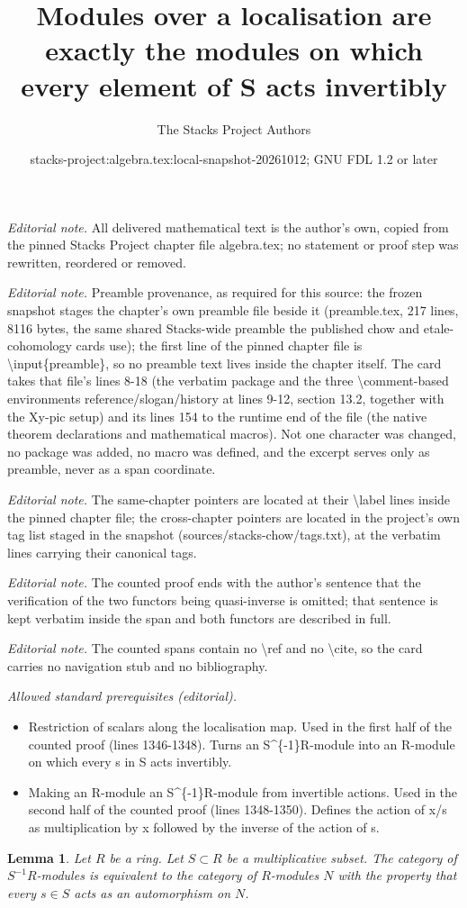 \documentclass[10pt,a4paper]{amsart}
\title{Modules over a localisation are exactly the modules on which every element of S acts invertibly}
\author{The Stacks Project Authors}
\date{stacks-project:algebra.tex:local-snapshot-20261012; GNU FDL 1.2 or later}
\theoremstyle{plain}
\newtheorem{lemma}[subsection]{Lemma}
\theoremstyle{definition}
\theoremstyle{remark}
\numberwithin{equation}{subsection}
\begin{document}
\maketitle
\noindent\textit{Editorial note.} All delivered mathematical text is the author's own, copied from the pinned Stacks Project chapter file algebra.tex; no statement or proof step was rewritten, reordered or removed.\par\medskip
\noindent\textit{Editorial note.} Preamble provenance, as required for this source: the frozen snapshot stages the chapter's own preamble file beside it (preamble.tex, 217 lines, 8116 bytes, the same shared Stacks-wide preamble the published chow and etale-cohomology cards use); the first line of the pinned chapter file is \textbackslash{}input\{preamble\}, so no preamble text lives inside the chapter itself. The card takes that file's lines 8-18 (the verbatim package and the three \textbackslash{}comment-based environments reference/slogan/history at lines 9-12, section 13.2, together with the Xy-pic setup) and its lines 154 to the runtime end of the file (the native theorem declarations and mathematical macros). Not one character was changed, no package was added, no macro was defined, and the excerpt serves only as preamble, never as a span coordinate.\par\medskip
\noindent\textit{Editorial note.} The same-chapter pointers are located at their \textbackslash{}label lines inside the pinned chapter file; the cross-chapter pointers are located in the project's own tag list staged in the snapshot (sources/stacks-chow/tags.txt), at the verbatim lines carrying their canonical tags.\par\medskip
\noindent\textit{Editorial note.} The counted proof ends with the author's sentence that the verification of the two functors being quasi-inverse is omitted; that sentence is kept verbatim inside the span and both functors are described in full.\par\medskip
\noindent\textit{Editorial note.} The counted spans contain no \textbackslash{}ref and no \textbackslash{}cite, so the card carries no navigation stub and no bibliography.\par\medskip
\noindent\textit{Allowed standard prerequisites (editorial).}\begin{itemize}
\item Restriction of scalars along the localisation map. Used in the first half of the counted proof (lines 1346-1348). Turns an S\textasciicircum{}\{-1\}R-module into an R-module on which every s in S acts invertibly.
\item Making an R-module an S\textasciicircum{}\{-1\}R-module from invertible actions. Used in the second half of the counted proof (lines 1348-1350). Defines the action of x/s as multiplication by x followed by the inverse of the action of s.
\end{itemize}\medskip
\begin{lemma}
\label{lemma-localization-and-modules}
Let $R$ be a ring. Let $S \subset R$ be a multiplicative subset.
The category of $S^{-1}R$-modules is equivalent to the category
of $R$-modules $N$ with the property that every $s \in S$ acts as
an automorphism on $N$.
\end{lemma}
\end{document}
